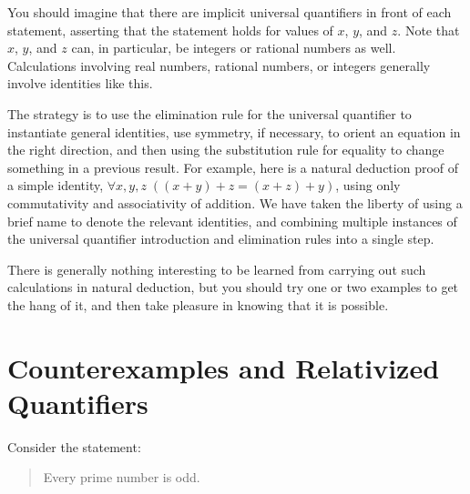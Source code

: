 \documentclass[letterpaper,10pt,english]{sphinxmanual}
\begin{document}
\sphinxAtStartPar
You should imagine that there are implicit universal quantifiers in front of each statement, asserting that the statement holds for  values of \(x\), \(y\), and \(z\). Note that \(x\), \(y\), and \(z\) can, in particular, be integers or rational numbers as well. Calculations involving real numbers, rational numbers, or integers generally involve identities like this.

\sphinxAtStartPar
The strategy is to use the elimination rule for the universal quantifier to instantiate general identities, use symmetry, if necessary, to orient an equation in the right direction, and then using the substitution rule for equality to change something in a previous result. For example, here is a natural deduction proof of a simple identity, \(\forall x, y, z \; ((x + y) + z = (x + z) + y)\), using only commutativity and associativity of addition. We have taken the liberty of using a brief name to denote the relevant identities, and combining multiple instances of the universal quantifier introduction and elimination rules into a single step.



\begin{center}
\AXM{}

\AXM{}

\AXM{}


\DP
\end{center}

\sphinxAtStartPar
There is generally nothing interesting to be learned from carrying out such calculations in natural deduction, but you should try one or two examples to get the hang of it, and then take pleasure in knowing that it is possible.


\section{Counterexamples and Relativized Quantifiers}
\label{\detokenize{natural_deduction_for_first_order_logic:counterexamples-and-relativized-quantifiers}}
\sphinxAtStartPar
Consider the statement:
\begin{quote}

\sphinxAtStartPar
Every prime number is odd.
\end{quote}
\end{document}
